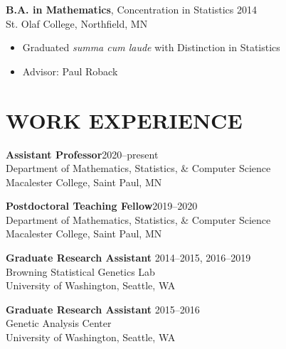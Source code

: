 \documentclass[margin]{res}
\begin{document}
\begin{resume}
					\textbf{B.A. in Mathematics}, Concentration in Statistics  \hfill 2014 \\ %
					St. Olaf College, Northfield, MN \vspace{0.1cm}
					\begin{itemize} \itemsep -2pt
					\item[] Graduated \textit{summa cum laude} with Distinction in Statistics 
					\item[]Advisor: Paul Roback\\
					\end{itemize}
					
\section{WORK EXPERIENCE}

\textbf{Assistant Professor}\hfill 2020--present \\
Department of Mathematics, Statistics, \& Computer Science \\
Macalester College, Saint Paul, MN

\textbf{Postdoctoral Teaching Fellow}\hfill 2019--2020 \\
Department of Mathematics, Statistics, \& Computer Science \\
Macalester College, Saint Paul, MN

\textbf{Graduate Research Assistant} \hfill 2014--2015, 2016--2019\\
Browning Statistical Genetics Lab \\
University of Washington, Seattle, WA
	
\textbf{Graduate Research Assistant} \hfill 2015--2016 \\
Genetic Analysis Center \\
University of Washington, Seattle, WA
	

\end{resume}
\end{document}

